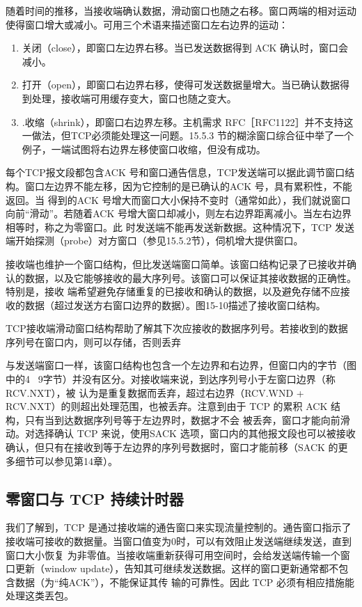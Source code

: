 随着时间的推移，当接收端确认数据，滑动窗口也随之右移。窗口两端的相对运动使得窗口增大或减小。可用三个术语来描述窗口左右边界的运动：
\begin{enumerate}
    \item 关闭（close），即窗口左边界右移。当已发送数据得到 ACK 确认时，窗口会减小。
    \item 打开（open），即窗口右边界右移，使得可发送数据量增大。当已确认数据得到处理，接收端可用缓存变大，窗口也随之变大。
    \item .收缩（shrink），即窗口右边界左移。主机需求 RFC［RFC1122］并不支持这一做法，但TCP必须能处理这一问题。15.5.3 节的糊涂窗口综合征中举了一个例子，一端试图将右边界左移使窗口收缩，但没有成功。
\end{enumerate}

每个TCP报文段都包含ACK 号和窗口通告信息，TCP发送端可以据此调节窗口结构。窗口左边界不能左移，因为它控制的是已确认的ACK 号，具有累积性，不能返回。当
得到的ACK 号增大而窗口大小保持不变时（通常如此），我们就说窗口向前“滑动”。若随着ACK 号增大窗口却减小，则左右边界距离减小。当左右边界相等时，称之为零窗口。此
时发送端不能再发送新数据。这种情况下，TCP 发送端开始探测（probe）对方窗口（参见15.5.2节），伺机增大提供窗口。

接收端也维护一个窗口结构，但比发送端窗口简单。该窗口结构记录了已接收并确认的数据，以及它能够接收的最大序列号。该窗口可以保证其接收数据的正确性。特别是，接收
端希望避免存储重复的已接收和确认的数据，以及避免存储不应接收的数据（超过发送方右窗口边界的数据）。图15-10描述了接收窗口结构。

TCP接收端滑动窗口结构帮助了解其下次应接收的数据序列号。若接收到的数据序列号在窗口内，则可以存储，否则丢弃

与发送端窗口一样，该窗口结构也包含一个左边界和右边界，但窗口内的字节（图中的4 ~9字节）并没有区分。对接收端来说，到达序列号小于左窗口边界（称 RCV.NXT），被
认为是重复数据而丢弃，超过右边界（RCV.WND + RCV.NXT）的则超出处理范围，也被丢弃。注意到由于 TCP 的累积 ACK 结构，只有当到达数据序列号等于左边界时，数据才不会
被丢奔，窗口才能向前滑动。对选择确认 TCP 来说，使用SACK 选项，窗口内的其他报文段也可以被接收确认，但只有在接收到等于左边界的序列号数据时，窗口才能前移（SACK
的更多细节可以参见第14章）。

\subsection{零窗口与 TCP 持续计时器}

我们了解到，TCP 是通过接收端的通告窗口来实现流量控制的。通告窗口指示了接收端可接收的数据量。当窗口值变为0时，可以有效阻止发送端继续发送，直到窗口大小恢复
为非零值。当接收端重新获得可用空间时，会给发送端传输一个窗口更新（window update），告知其可继续发送数据。这样的窗口更新通常都不包含数据（为“纯ACK”），不能保证其传
输的可靠性。因此 TCP 必须有相应措施能处理这类丟包。

